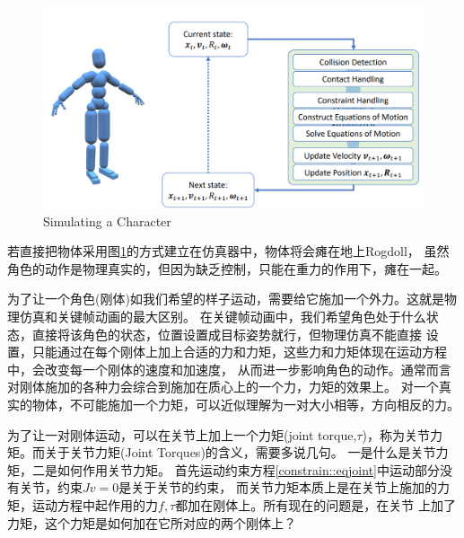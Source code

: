 \documentclass[lang=cn,newtx,10pt,scheme=chinese]{elegantbook}
\begin{document}
\begin{figure}[htbp]
  \centering
  \includegraphics[totalheight=2.5in]{"./image/SimulatingCharacter.png"}
  \caption{Simulating a Character} \label{fig:SimulatingCharacter}
\end{figure}
若直接把物体采用图\ref{fig:SimulatingCharacter}的方式建立在仿真器中，物体将会瘫在地上Rogdoll，
虽然角色的动作是物理真实的，但因为缺乏控制，只能在重力的作用下，瘫在一起。

为了让一个角色(刚体)如我们希望的样子运动，需要给它施加一个外力。这就是物理仿真和关键帧动画的最大区别。
在关键帧动画中，我们希望角色处于什么状态，直接将该角色的状态，位置设置成目标姿势就行，但物理仿真不能直接
设置，只能通过在每个刚体上加上合适的力和力矩，这些力和力矩体现在运动方程中，会改变每一个刚体的速度和加速度，
从而进一步影响角色的动作。通常而言对刚体施加的各种力会综合到施加在质心上的一个力，力矩的效果上。
对一个真实的物体，不可能施加一个力矩，可以近似理解为一对大小相等，方向相反的力。

为了让一对刚体运动，可以在关节上加上一个力矩(joint torque,$\tau$)，称为关节力矩。而关于关节力矩(Joint Torques)的含义，需要多说几句。
一是什么是关节力矩，二是如何作用关节力矩。
首先运动约束方程\ref{constrain::eqjoint}中运动部分没有关节，约束$Jv=0$是关于关节的约束，
而关节力矩本质上是在关节上施加的力矩，运动方程中起作用的力$f,\tau$都加在刚体上。所有现在的问题是，在关节
上加了力矩，这个力矩是如何加在它所对应的两个刚体上？
\end{document}
